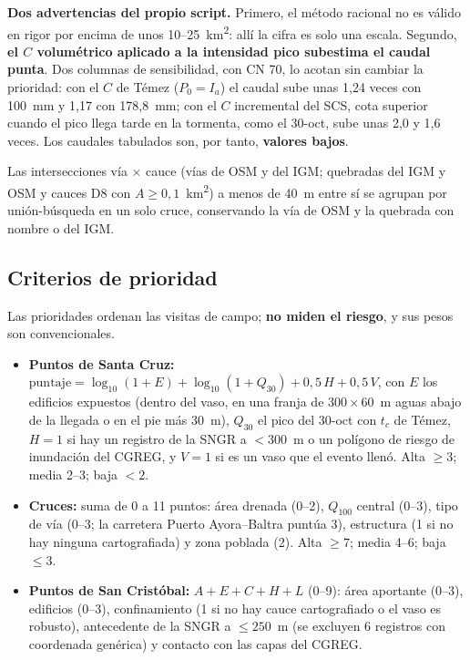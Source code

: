 \documentclass{sosg-informe}
\newcommand{\kmc}{km\textsuperscript{2}}
\begin{document}
\textbf{Dos advertencias del propio script.} Primero, el método racional no es válido en rigor por encima de unos 10--25~\kmc: allí la cifra es solo una escala. Segundo, \textbf{el $C$ volumétrico aplicado a la intensidad pico subestima el caudal punta}. Dos columnas de sensibilidad, con CN 70, lo acotan sin cambiar la prioridad: con el $C$ de Témez ($P_0 = I_a$) el caudal sube unas 1,24 veces con 100~mm y 1,17 con 178,8~mm; con el $C$ incremental del SCS, cota superior cuando el pico llega tarde en la tormenta, como el 30-oct, sube unas 2,0 y 1,6 veces. Los caudales tabulados son, por tanto, \textbf{valores bajos}.

Las intersecciones vía $\times$ cauce (vías de OSM y del IGM; quebradas del IGM y OSM y cauces D8 con $A \geq 0{,}1$~\kmc) a menos de 40~m entre sí se agrupan por unión-búsqueda en un solo cruce, conservando la vía de OSM y la quebrada con nombre o del IGM.

\subsection{Criterios de prioridad}
Las prioridades ordenan las visitas de campo; \textbf{no miden el riesgo}, y sus pesos son convencionales.
\begin{itemize}
  \item \textbf{Puntos de Santa Cruz:} $\text{puntaje} = \log_{10}(1 + E) + \log_{10}(1 + Q_{30}) + 0{,}5\,H + 0{,}5\,V$, con $E$ los edificios expuestos (dentro del vaso, en una franja de $300 \times 60$~m aguas abajo de la llegada o en el pie más 30~m), $Q_{30}$ el pico del 30-oct con $t_c$ de Témez, $H = 1$ si hay un registro de la SNGR a $< 300$~m o un polígono de riesgo de inundación del CGREG, y $V = 1$ si es un vaso que el evento llenó. Alta $\geq 3$; media 2--3; baja $< 2$.
  \item \textbf{Cruces:} suma de 0 a 11 puntos: área drenada (0--2), $Q_{100}$ central (0--3), tipo de vía (0--3; la carretera Puerto Ayora--Baltra puntúa 3), estructura (1 si no hay ninguna cartografiada) y zona poblada (2). Alta $\geq 7$; media 4--6; baja $\leq 3$.
  \item \textbf{Puntos de San Cristóbal:} $A + E + C + H + L$ (0--9): área aportante (0--3), edificios (0--3), confinamiento (1 si no hay cauce cartografiado o el vaso es robusto), antecedente de la SNGR a $\leq 250$~m (se excluyen 6 registros con coordenada genérica) y contacto con las capas del CGREG.
\end{itemize}
\end{document}
